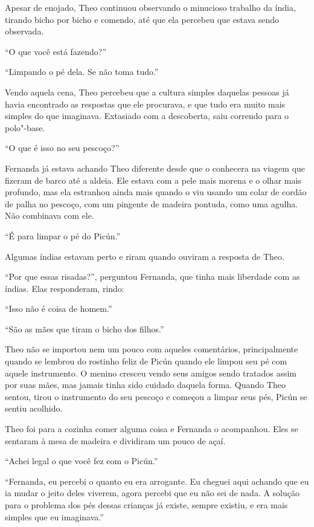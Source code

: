 Apesar de enojado, Theo continuou observando o minucioso trabalho da
índia, tirando bicho por bicho e comendo, até que ela percebeu que
estava sendo observada.

``O que você está fazendo?''

``Limpando o pé dela. Se não toma tudo.''

Vendo aquela cena, Theo percebeu
que a cultura simples daquelas pessoas já havia encontrado as respostas
que ele procurava, e que tudo era muito mais simples do que imaginava.
Extasiado com a descoberta, saiu correndo para o polo"-base.

\asterisc


``O que é isso no seu pescoço?''

Fernanda já estava achando Theo diferente desde que o conhecera na
viagem que fizeram de barco até a aldeia. Ele estava com a pele mais
morena e o olhar mais profundo, mas ela estranhou ainda mais quando o
viu usando um colar de cordão de palha no pescoço, com um pingente de
madeira pontuda, como uma agulha. Não combinava com ele.

``É para limpar o pé do Picún.''

Algumas índias estavam perto e riram quando ouviram a resposta de Theo.

``Por que essas risadas?'', perguntou Fernanda, que tinha mais liberdade
com as índias. Elas responderam, rindo:

``Isso não é coisa de homem.''

``São as mães que tiram o bicho dos filhos.''

Theo não se importou nem um pouco com
aqueles comentários, principalmente quando se lembrou do rostinho feliz
de Picún quando ele limpou seu pé com aquele instrumento. O menino
cresceu vendo seus amigos sendo tratados assim por suas mães, mas jamais
tinha sido cuidado daquela forma. Quando Theo sentou, tirou o
instrumento do seu pescoço e começou a limpar seus pés, Picún se sentiu
acolhido.

Theo foi para a cozinha comer alguma coisa e Fernanda o acompanhou. Eles
se sentaram à mesa de madeira e dividiram um pouco de açaí.

``Achei legal o que você fez com o Picún.''

``Fernanda, eu percebi o quanto eu era arrogante. Eu cheguei aqui
achando que eu ia mudar o jeito deles viverem, agora percebi que eu não
sei de nada. A solução para o problema dos pés dessas crianças já
existe, sempre existiu, e era mais simples que eu imaginava.''


